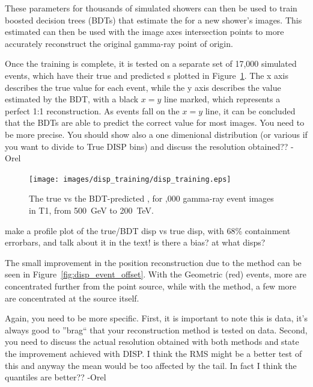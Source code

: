     These parameters for thousands of simulated showers can then be used to train boosted decision trees (BDTs) that estimate the \disp{} for a new shower's images.
    This estimated \disp{} can then be used with the image axes intersection points to more accurately reconstruct the original gamma-ray point of origin.
    
    Once the training is complete, it is tested on a separate set of 17,000 simulated events, which have their true and predicted \disp{}s plotted in Figure~\ref{fig:disptraining}.
    The x axis describes the true \disp{} value for each event, while the y axis describes the \disp{} value estimated by the BDT, with a black $x=y$ line marked, which represents a perfect 1:1 \disp{} reconstruction.
    As events fall on the $x=y$ line, it can be concluded that the BDTs are able to predict the correct \disp{} value for most images.
    {\color{red} You need to be more precise.  You should show also a one dimenional distribution (or various if you want to divide to True DISP bins) and discuss the resolution obtained?? -Orel}

    \begin{figure}[ht]
      \centering
      \texttt{[image: images/disp\_training/disp\_training.eps]}
      \caption[Disp BDT Training]{
        The true \disp{} vs the BDT-predicted \disp{}, for ,000 gamma-ray event images in T1, from \SI{500}{\GeV} to \SI{200}{\TeV}.
      }
      \label{fig:disptraining}
    \end{figure}
    
    {\color{red} make a profile plot of the true/BDT disp vs true disp, with 68\% containment errorbars, and talk about it in the text! is there a bias? at what disps? }

    The small improvement in the position reconstruction due to the \disp{} method can be seen in Figure~\ref{fig:disp_event_offset}.
    With the Geometric (red) events, more are concentrated further from the point source, while with the \disp{} method, a few more are concentrated at the source itself.
    
    {\color{red}Again, you need to be more specific. First, it is important to note this is data, it's always good to ''brag`` that your reconstruction method is tested on data.  Second, you need to discuss the actual resolution obtained with both methods and state the improvement achieved with DISP. I think the RMS might be a better test of this and anyway the mean would be too affected by the tail. In fact I think the quantiles are better?? -Orel}
    

